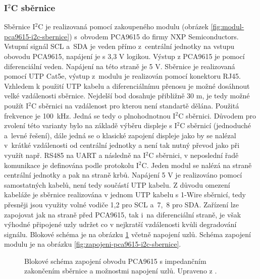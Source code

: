 \subsubsection{I$^2$C sběrnice}
\label{sec:i2c-sbernice}
Sběrnice I$^2$C je realizovaná pomocí zakoupeného modulu (obrázek \ref{fig:modul-pca9615-i2c-sbernice}) s~obvodem PCA9615 do firmy  NXP Semiconductors. Vstupní signál SCL a~SDA je veden přímo z~centrální jednotky na vstupu obovodu PCA9615, napájení je s 3,3 V logikou. Výstup z PCA9615 je pomocí diferenciální veden. Napájení na této straně je 5 V. Sběrnice je realizovaná pomocí UTP Cat5e, výstup z~modulu je realizován pomocí konektoru RJ45. Vzhledem k použití UTP kabelu a diferenciálnímu přenosu je možné dosáhnout velké vzdálenosti sběrnice. Nejdelší bod dosahuje přibližně 30 m, je tedy možné použít I$^2$C sběrnici na vzdálenost pro kterou není standartě dělána. Použitá frekvence je 100~kHz. Jedná se tedy o plnohodnotnou I$^2$C sběrnici. Důvodem pro zvolení této varianty bylo na základě výběru displeje s I$^2$C sběrnicí (jednoduché a~levné řešení), dále jedná se o klasické zapojení displeje jako by se nalézal v~krátké vzdálenosti od centrální jednotky a není tak nutný převod jako při využít např. RS485 na UART a následně na I$^2$C sběrnici, v neposlední řadě komunikace je definována podle protokolu I$^2$C.  Jeden modul se nalézá na straně centrální jednotky a pak na straně krbů. Napájení 5 V je realizováno pomocí samostatných kabelů, není tedy součástí UTP kabelu. Z důvodu omezení kabeláže je sběrnice realizována v jednom UTP kabelu s 1-Wire sběrnicí, tedy přesněji jsou využity volné vodiče 1,2 pro SCL a~7,~8 pro SDA. Zařízení lze zapojovat jak na straně před PCA9615, tak i~na diferenciální straně, je však výhodné připojené uzly udržet co v nejkratší vzdálenosti kvůli degradování signálu. Blokové schéma je na obrázku \ref{fig:blokove-schema-pca9615-i2c-sbernice} včetně napojení uzlů. Schéma zapojení modulu je na obrázku \ref{fig:zapojeni-pca9615-i2c-sbernice}.

\begin{figure}[H]
    \centering
    \def\svgwidth{\columnwidth}
    
    \caption[Blokové schéma zapojení obvodu PCA9615.]{Blokové schéma zapojení obvodu PCA9615 s impedančním zakončením sběrnice a možnostmi napojení uzlů. Upraveno z \cite{pca9615-schema-zapojeni}.}
    \label{fig:blokove-schema-pca9615-i2c-sbernice}
\end{figure}

